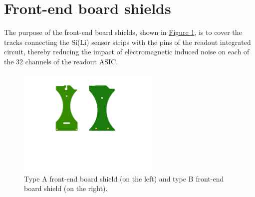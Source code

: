 \begin{table}[ht]
    \centering
    \def\arraystretch{1.3}
    \caption{Structure of the entry for the termination connectors test report.}
    \label{tabTERMCONNstruct}
\end{table}



\section{Front-end board shields} \label{secShield}

The purpose of the front-end board shields, shown in \hyperref[figShieldsAB]{Figure \ref{figShieldsAB}}, is to cover the tracks connecting the Si(Li) sensor strips with the pins of the readout integrated circuit, thereby reducing the impact of electromagnetic induced noise on each of the 32 channels of the readout ASIC.

\begin{figure}[h!]
    \centering
    \includegraphics[width=0.6\textwidth]{Images/chap2/shieldsPDFtwo.pdf}
    \caption{Type A front-end board shield (on the left) and type B front-end board shield (on the right).}
    \label{figShieldsAB}
\end{figure}

